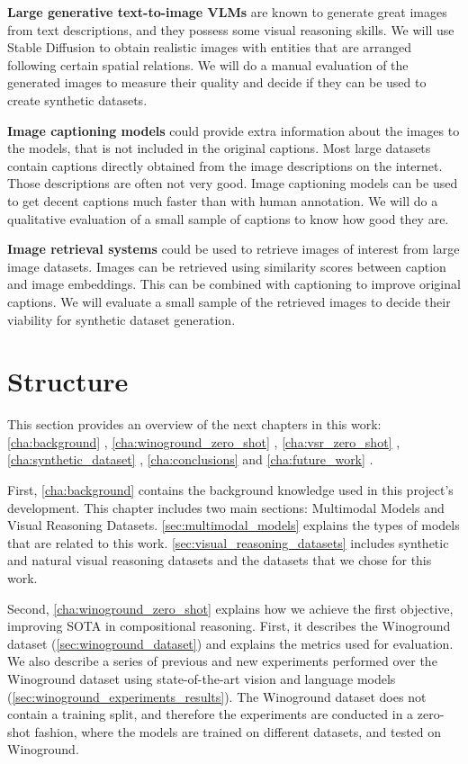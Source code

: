 \textbf{Large generative text-to-image VLMs} are known to generate great images from text descriptions, and they possess some visual reasoning skills. We will use Stable Diffusion \cite{rombach2021highresolution} to obtain realistic images with entities that are arranged following certain spatial relations. We will do a manual evaluation of the generated images to measure their quality and decide if they can be used to create synthetic datasets.

\textbf{Image captioning models} could provide extra information about the images to the models, that is not included in the original captions. Most large datasets contain captions directly obtained from the image descriptions on the internet. Those descriptions are often not very good. Image captioning models can be used to get decent captions much faster than with human annotation. We will do a qualitative evaluation of a small sample of captions to know how good they are.

\textbf{Image retrieval systems} could be used to retrieve images of interest from large image datasets. Images can be retrieved using similarity scores between caption and image embeddings. This can be combined with captioning to improve original captions. We will evaluate a small sample of the retrieved images to decide their viability for synthetic dataset generation.

\section{Structure} \label{sec:structure}

This section provides an overview of the next chapters in this work: \ref{cha:background} , \ref{cha:winoground_zero_shot} , \ref{cha:vsr_zero_shot} , \ref{cha:synthetic_dataset} , \ref{cha:conclusions}  and \ref{cha:future_work} .

First, \cref{cha:background} contains the background knowledge used in this project's development. This chapter includes two main sections: Multimodal Models and Visual Reasoning Datasets. \cref{sec:multimodal_models} explains the types of models that are related to this work. \cref{sec:visual_reasoning_datasets} includes synthetic and natural visual reasoning datasets and the datasets that we chose for this work.

Second, \cref{cha:winoground_zero_shot} explains how we achieve the first objective, improving SOTA in compositional reasoning. First, it describes the Winoground \cite{thrush2022winoground} dataset (\cref{sec:winoground_dataset}) and explains the metrics used for evaluation. We also describe a series of previous and new experiments performed over the Winoground dataset using state-of-the-art vision and language models (\cref{sec:winoground_experiments_results}). The Winoground dataset does not contain a training split, and therefore the experiments are conducted in a zero-shot fashion, where the models are trained on different datasets, and tested on Winoground.

